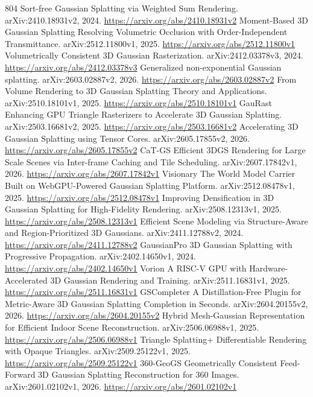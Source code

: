 \documentclass[11pt]{article}
\begin{document}
\begin{thebibliography}{804}
 Sort-free Gaussian Splatting via Weighted Sum Rendering. arXiv:2410.18931v2, 2024. \url{https://arxiv.org/abs/2410.18931v2}
 Moment-Based 3D Gaussian Splatting Resolving Volumetric Occlusion with Order-Independent Transmittance. arXiv:2512.11800v1, 2025. \url{https://arxiv.org/abs/2512.11800v1}
 Volumetrically Consistent 3D Gaussian Rasterization. arXiv:2412.03378v3, 2024. \url{https://arxiv.org/abs/2412.03378v3}
 Generalized non-exponential Gaussian splatting. arXiv:2603.02887v2, 2026. \url{https://arxiv.org/abs/2603.02887v2}
 From Volume Rendering to 3D Gaussian Splatting Theory and Applications. arXiv:2510.18101v1, 2025. \url{https://arxiv.org/abs/2510.18101v1}
 GauRast Enhancing GPU Triangle Rasterizers to Accelerate 3D Gaussian Splatting. arXiv:2503.16681v2, 2025. \url{https://arxiv.org/abs/2503.16681v2}
 Accelerating 3D Gaussian Splatting using Tensor Cores. arXiv:2605.17855v2, 2026. \url{https://arxiv.org/abs/2605.17855v2}
 CaT-GS Efficient 3DGS Rendering for Large Scale Scenes via Inter-frame Caching and Tile Scheduling. arXiv:2607.17842v1, 2026. \url{https://arxiv.org/abs/2607.17842v1}
 Visionary The World Model Carrier Built on WebGPU-Powered Gaussian Splatting Platform. arXiv:2512.08478v1, 2025. \url{https://arxiv.org/abs/2512.08478v1}
 Improving Densification in 3D Gaussian Splatting for High-Fidelity Rendering. arXiv:2508.12313v1, 2025. \url{https://arxiv.org/abs/2508.12313v1}
 Efficient Scene Modeling via Structure-Aware and Region-Prioritized 3D Gaussians. arXiv:2411.12788v2, 2024. \url{https://arxiv.org/abs/2411.12788v2}
 GaussianPro 3D Gaussian Splatting with Progressive Propagation. arXiv:2402.14650v1, 2024. \url{https://arxiv.org/abs/2402.14650v1}
 Vorion A RISC-V GPU with Hardware-Accelerated 3D Gaussian Rendering and Training. arXiv:2511.16831v1, 2025. \url{https://arxiv.org/abs/2511.16831v1}
 GSCompleter A Distillation-Free Plugin for Metric-Aware 3D Gaussian Splatting Completion in Seconds. arXiv:2604.20155v2, 2026. \url{https://arxiv.org/abs/2604.20155v2}
 Hybrid Mesh-Gaussian Representation for Efficient Indoor Scene Reconstruction. arXiv:2506.06988v1, 2025. \url{https://arxiv.org/abs/2506.06988v1}
 Triangle Splatting+ Differentiable Rendering with Opaque Triangles. arXiv:2509.25122v1, 2025. \url{https://arxiv.org/abs/2509.25122v1}
 360-GeoGS Geometrically Consistent Feed-Forward 3D Gaussian Splatting Reconstruction for 360 Images. arXiv:2601.02102v1, 2026. \url{https://arxiv.org/abs/2601.02102v1}

\end{thebibliography}
\end{document}
